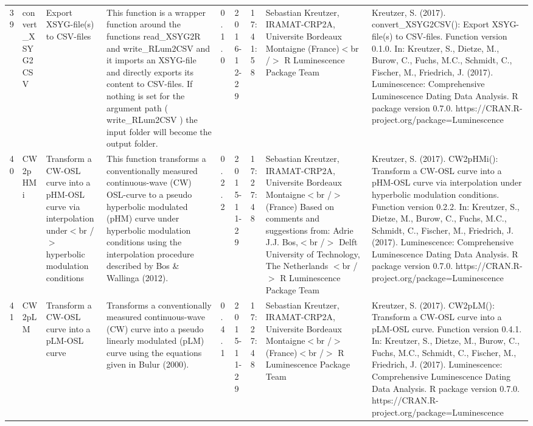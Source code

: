 \begin{table}[ht]
\begin{tabular}{rllllllll}
 \\ 
  39 & convert\_XSYG2CSV & Export XSYG-file(s) to CSV-files & This function is a wrapper function around the functions  read\_XSYG2R  and write\_RLum2CSV  and it imports an XSYG-file and directly exports its content to CSV-files. If nothing is set for the argument  path  ( write\_RLum2CSV ) the input folder will become the output folder. & 0.1.0 & 2016-12-29 & 17:41:58
 & Sebastian Kreutzer, IRAMAT-CRP2A, Universite Bordeaux Montaigne (France)$<$br /$>$  R Luminescence Package Team & Kreutzer, S. (2017). convert\_XSYG2CSV(): Export XSYG-file(s) to CSV-files. Function version 0.1.0. In: Kreutzer, S., Dietze, M., Burow, C., Fuchs, M.C., Schmidt, C., Fischer, M., Friedrich, J. (2017). Luminescence: Comprehensive Luminescence Dating Data Analysis. R package version 0.7.0. https://CRAN.R-project.org/package=Luminescence
 \\ 
  40 & CW2pHMi & Transform a CW-OSL curve into a pHM-OSL curve via interpolation under$<$br /$>$ hyperbolic modulation conditions & This function transforms a conventionally measured continuous-wave (CW) OSL-curve to a pseudo hyperbolic modulated (pHM) curve under hyperbolic modulation conditions using the interpolation procedure described by Bos \& Wallinga (2012). & 0.2.2 & 2015-11-29 & 17:27:48
 & Sebastian Kreutzer, IRAMAT-CRP2A, Universite Bordeaux Montaigne$<$br /$>$ (France)   Based on comments and suggestions from:  Adrie J.J. Bos,$<$br /$>$ Delft University of Technology, The Netherlands $<$br /$>$  R Luminescence Package Team & Kreutzer, S. (2017). CW2pHMi(): Transform a CW-OSL curve into a pHM-OSL curve via interpolation under hyperbolic modulation conditions. Function version 0.2.2. In: Kreutzer, S., Dietze, M., Burow, C., Fuchs, M.C., Schmidt, C., Fischer, M., Friedrich, J. (2017). Luminescence: Comprehensive Luminescence Dating Data Analysis. R package version 0.7.0. https://CRAN.R-project.org/package=Luminescence
 \\ 
  41 & CW2pLM & Transform a CW-OSL curve into a pLM-OSL curve & Transforms a conventionally measured continuous-wave (CW) curve into a pseudo linearly modulated (pLM) curve using the equations given in Bulur (2000). & 0.4.1 & 2015-11-29 & 17:27:48
 & Sebastian Kreutzer, IRAMAT-CRP2A, Universite Bordeaux Montaigne$<$br /$>$ (France)$<$br /$>$  R Luminescence Package Team & Kreutzer, S. (2017). CW2pLM(): Transform a CW-OSL curve into a pLM-OSL curve. Function version 0.4.1. In: Kreutzer, S., Dietze, M., Burow, C., Fuchs, M.C., Schmidt, C., Fischer, M., Friedrich, J. (2017). Luminescence: Comprehensive Luminescence Dating Data Analysis. R package version 0.7.0. https://CRAN.R-project.org/package=Luminescence

\end{tabular}
\end{table}
